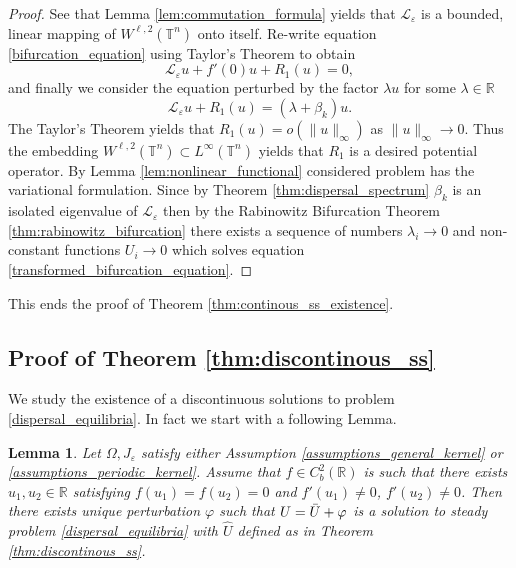 \documentclass[12pt, a4paper]{article}
\theoremstyle{break}
\theoremstyle{break}
\theoremstyle{break}
\theoremstyle{break}
\newtheorem{lem}{Lemma}[section]
\theoremstyle{break}
\newcommand{\Leo}{\mathcal{L}_{\varepsilon}}
\begin{document}
\begin{proof}
    See that Lemma \ref{lem:commutation_formula} yields that $\Leo$ is a bounded, linear mapping of $W^{\ell,2}(\mathbb{T}^n)$ onto itself. Re-write equation \eqref{bifurcation_equation} using Taylor's Theorem to obtain
    \begin{equation*}
        \Leo u + f'(0) u + R_1(u) = 0,
    \end{equation*}
    and finally we consider the equation perturbed by the factor $\lambda u$ for some $\lambda \in \mathbb{R}$
    \begin{equation}
        \Leo u + R_1(u) = (\lambda + \beta_k)u.
        \label{transformed_bifurcation_equation}
    \end{equation}
    The Taylor's Theorem yields that $R_1(u) = o(\|u\|_\infty)$ as $\|u\|_\infty \rightarrow 0$. Thus the embedding $W^{\ell,2}(\mathbb{T}^n) \subset L^\infty(\mathbb{T}^n)$ yields that $R_1$ is a desired potential operator. By Lemma \ref{lem:nonlinear_functional} considered problem has the variational formulation. Since by Theorem \ref{thm:dispersal_spectrum} $\beta_k$ is an isolated eigenvalue of $\Leo$ then by the Rabinowitz Bifurcation Theorem \ref{thm:rabinowitz_bifurcation} there exists a sequence of numbers $\lambda_i \rightarrow 0$ and non-constant functions $U_i \rightarrow 0$ which solves equation \eqref{transformed_bifurcation_equation}.
\end{proof}

This ends the proof of Theorem \ref{thm:continous_ss_existence}.

\subsection{Proof of Theorem \ref{thm:discontinous_ss}}

We study the existence of a discontinuous solutions to problem \eqref{dispersal_equilibria}. In fact we start with a following Lemma.

\begin{lem}    
    Let $\Omega, J_\varepsilon$ satisfy either Assumption \ref{assumptions_general_kernel} or \ref{assumptions_periodic_kernel}. Assume that $f \in C^2_b(\mathbb{R})$ is such that there exists $u_1, u_2 \in \mathbb{R}$ satisfying $f(u_1) = f(u_2) = 0$ and $f'(u_1) \neq 0$, $f'(u_2) \neq 0$. Then there exists unique perturbation $\varphi$ such that $U = \Bar{U} + \varphi$ is a solution to steady problem \eqref{dispersal_equilibria} with $\hat{U}$ defined as in Theorem \ref{thm:discontinous_ss}.
    \label{lem:discontinuos_ss_existence}
\end{lem}
\end{document}
